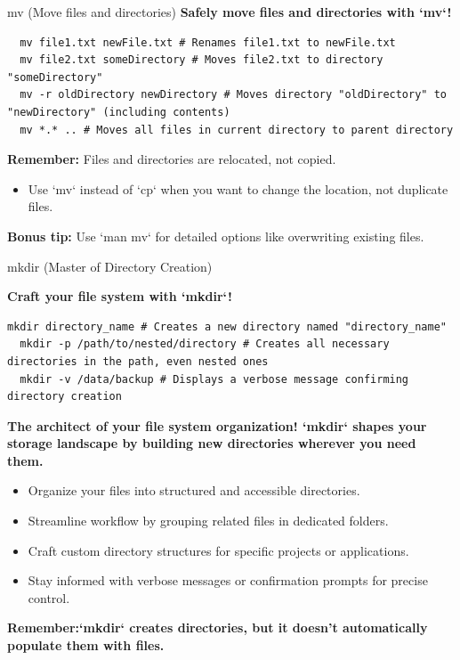 \documentclass{beamer}
\begin{document}
\begin{frame}[fragile]{mv (Move files and directories)}
  \textbf{Safely move files and directories with `mv`!}

    \begin{lstlisting}
  mv file1.txt newFile.txt # Renames file1.txt to newFile.txt
  mv file2.txt someDirectory # Moves file2.txt to directory "someDirectory"
  mv -r oldDirectory newDirectory # Moves directory "oldDirectory" to "newDirectory" (including contents)
  mv *.* .. # Moves all files in current directory to parent directory
  \end{lstlisting}

  \textbf{Remember:} Files and directories are relocated, not copied.

  \begin{itemize}
    \item Use `mv` instead of `cp` when you want to change the location, not duplicate files.
  \end{itemize}

  \textbf{Bonus tip:} Use `man mv` for detailed options like overwriting existing files.

\end{frame}

\begin{frame}[fragile]{mkdir (Master of Directory Creation)}

  \textbf{Craft your file system with `mkdir`!}

  \begin{lstlisting}[frame=none]
  mkdir directory_name # Creates a new directory named "directory_name"
  mkdir -p /path/to/nested/directory # Creates all necessary directories in the path, even nested ones
  mkdir -v /data/backup # Displays a verbose message confirming directory creation
  \end{lstlisting}

  \textbf{The architect of your file system organization! `mkdir` shapes your storage landscape by building new directories wherever you need them.}

  \begin{itemize}
    \item Organize your files into structured and accessible directories.
    \item Streamline workflow by grouping related files in dedicated folders.
    \item Craft custom directory structures for specific projects or applications.
    \item Stay informed with verbose messages or confirmation prompts for precise control.
  \end{itemize}

  \textbf{Remember:`mkdir` creates directories, but it doesn't automatically populate them with files.}

\end{frame}
\end{document}
